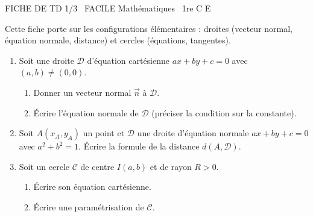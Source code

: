 \documentclass[11pt]{article}
\begin{document}
\begin{tcolorbox}[enhanced,colback=popink,colframe=popink,arc=10pt,boxrule=0pt,left=12pt,right=12pt,top=9pt,bottom=9pt]
{\color{white}\popxbold\small FICHE DE TD 1/3 \textbullet\ FACILE \hfill Mathématiques \textbullet\ 1re C E\par}
\end{tcolorbox}
\vspace{4pt}
Cette fiche porte sur les configurations élémentaires : droites (vecteur normal, équation normale, distance) et cercles (équations, tangentes).

\begin{exercice}
\begin{enumerate}
    \item Soit une droite $\mathcal{D}$ d'équation cartésienne $ax+by+c=0$ avec $(a,b)\neq(0,0)$. 
    \begin{enumerate}
        \item Donner un vecteur normal $\vec{n}$ à $\mathcal{D}$.
        \item Écrire l'équation normale de $\mathcal{D}$ (préciser la condition sur la constante).
    \end{enumerate}
    \item Soit $A(x_A,y_A)$ un point et $\mathcal{D}$ une droite d'équation normale $ax+by+c=0$ avec $a^2+b^2=1$. 
    Écrire la formule de la distance $d(A,\mathcal{D})$.
    \item Soit un cercle $\mathcal{C}$ de centre $I(a,b)$ et de rayon $R>0$. 
    \begin{enumerate}
        \item Écrire son équation cartésienne.
        \item Écrire une paramétrisation de $\mathcal{C}$.
    \end{enumerate}
\end{enumerate}
\end{exercice}
\end{document}

